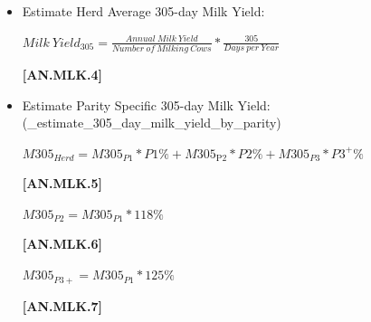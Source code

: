 \begin{refsection}
\begin{enumerate}
        \begin{itemize}
            \item Estimate Herd Average 305-day Milk Yield:
            \vspace{0.5cm}
            
            \begin{center}
                \(Milk\ Yield_{305} = \frac{Annual\ Milk\ Yield}{Number\ of\ Milking\ Cows} * \frac{305}{Days\ per\ Year}\)
            \end{center}
            \vspace{0.5cm}
            
            {\raggedleft \textbf{[AN.MLK.4]}\par}
            \vspace{0.5cm}

            \item Estimate Parity Specific 305-day Milk Yield: (\_estimate\_305\_day\_milk\_yield\_by\_parity)
            \vspace{0.5cm}
            
            \begin{center}
                \(M305_{Herd} = M305_{P1} * P1\% + M305_{\text{P2}} * P2\% + M305_{P3} * P3^+\%\)
            \end{center}
            \vspace{0.5cm}
            
            {\raggedleft \textbf{[AN.MLK.5]}\par}
            \vspace{0.5cm}
            
            \begin{center}
                \(M305_{P2} = M305_{P1} * 118\%\)
            \end{center}
            \vspace{0.5cm}
            
            {\raggedleft \textbf{[AN.MLK.6]}\par}
            \vspace{0.5cm}
            
            \begin{center}
                \(M305_{P3+} = M305_{P1} * 125\%\)
            \end{center}
            \vspace{0.5cm}
            
            {\raggedleft \textbf{[AN.MLK.7]}\par}
            \vspace{0.5cm}
            

\end{itemize}
\end{enumerate}
\end{refsection}
